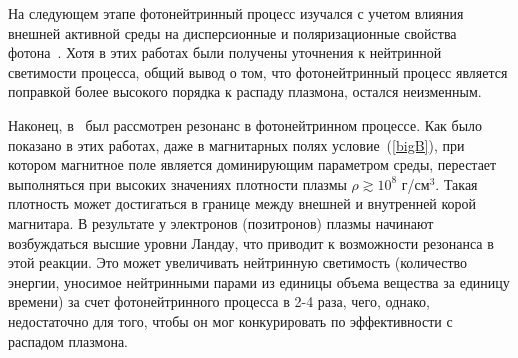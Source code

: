 На следующем этапе фотонейтринный процесс изучался с учетом влияния внешней активной среды на дисперсионные и поляризационные свойства фотона~\cite{RCh:2008,Borisov:2012,RumChMik}. Хотя в этих работах были получены уточнения к нейтринной светимости процесса, общий вывод о том, что фотонейтринный процесс является поправкой более высокого порядка к распаду плазмона, остался неизменным.

Наконец, в~\cite{Chistyakov:2014cga,qfthep2017} был рассмотрен резонанс в фотонейтринном процессе. Как было показано в этих работах, даже в магнитарных полях условие~(\ref{bigB}), при котором магнитное поле является доминирующим параметром среды, перестает выполняться при высоких значениях плотности плазмы $\rho \gtrsim 10^8$ г/см$^3$. Такая плотность может достигаться в границе между внешней и внутренней корой магнитара. В результате у электронов (позитронов) плазмы начинают возбуждаться высшие уровни Ландау, что приводит к возможности резонанса в этой реакции. Это может увеличивать нейтринную светимость (количество энергии, уносимое нейтринными парами из единицы объема вещества за единицу времени) за счет фотонейтринного процесса в 2-4 раза, чего, однако, недостаточно для того, чтобы он мог конкурировать по эффективности с распадом плазмона.